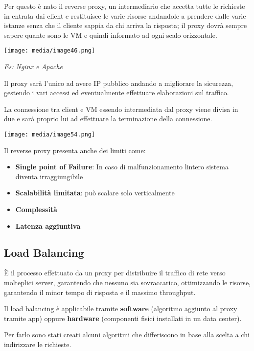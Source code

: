 Per questo è nato il reverse proxy, un intermediario che accetta tutte
le richieste in entrata dai client e restituisce le varie risorse
andandole a prendere dalle varie istanze senza che il cliente sappia da
chi arriva la risposta; il proxy dovrà sempre sapere quante sono le VM e
quindi informato ad ogni scalo orizzontale.

\texttt{[image: media/image46.png]}

\emph{Es: Nginx e Apache}

Il proxy sarà l'unico ad avere IP pubblico andando a migliorare la
sicurezza, gestendo i vari accessi ed eventualmente effettuare
elaborazioni sul traffico.

La connessione tra client e VM essendo intermediata dal proxy viene
divisa in due e sarà proprio lui ad effettuare la terminazione della
connessione.

\texttt{[image: media/image54.png]}

Il reverse proxy presenta anche dei limiti come:

\begin{itemize}
\item
  \textbf{Single point of Failure}: In caso di malfunzionamento
  l\textquotesingle intero sistema diventa irraggiungibile
\item
  \textbf{Scalabilità limitata}: può scalare solo verticalmente
\item
  \textbf{Complessità}
\item
  \textbf{Latenza aggiuntiva}
\end{itemize}

\subsection{Load Balancing}\label{load-balancing}

È il processo effettuato da un proxy per distribuire il traffico di rete
verso molteplici server, garantendo che nessuno sia sovraccarico,
ottimizzando le risorse, garantendo il minor tempo di risposta e il
massimo throughput.

Il load balancing è applicabile tramite \textbf{software} (algoritmo
aggiunto al proxy tramite app) oppure \textbf{hardware} (componenti
fisici installati in un data center).

Per farlo sono stati creati alcuni algoritmi che differiscono in base
alla scelta a chi indirizzare le richieste.

